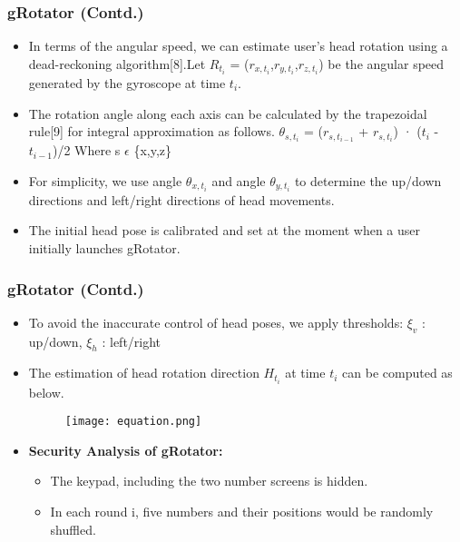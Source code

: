 \documentclass{beamer}
\begin{document}
\begin{frame}
\frametitle{gRotator (Contd.)}

\justifying

\begin{itemize}

\justifying

    \item  In terms of the angular speed, we can estimate
user's head rotation using a dead-reckoning algorithm[8].\newline Let
$R_{t_{i}}$ = ($r_{x,t_i}$,$r_{y,t_i}$,$r_{z,t_i}$) be the angular speed generated by the
gyroscope at time $t_i$.
    
    \item The rotation angle along each axis can be
calculated by the trapezoidal rule[9] for integral approximation
as follows.\newline
$\theta_{s,t_{i}}$ = ($r_{s,t_{i-1}}$ + $r_{s,t_{i}}$) · ($t_i$ - $t_{i-1}$)/2 \newline 
Where s $\epsilon$ \{x,y,z\}
    
    \item For simplicity, we use angle $\theta_{x,t_{i}}$ and angle $\theta_{y,t_{i}}$ to determine the up/down
directions and left/right directions of head movements.
    \item The initial head pose is calibrated and set at the
moment when a user initially launches gRotator.
\end{itemize}
\end{frame} 


\begin{frame}
\frametitle{gRotator (Contd.)}

\begin{itemize}

\justifying

    \item To avoid the inaccurate
control of head poses, we apply thresholds:\newline
$\xi_v$ : up/down,   $\xi_h$ : left/right
    
    \item  The estimation of head rotation direction
$H_{t_{i}}$ at time $t_i$ can be computed as below. 
\begin{figure}
    \begin{center}
        \texttt{[image: equation.png]}
    \end{center}
\end{figure}
    
    \item \textbf{Security Analysis of gRotator:}
    \begin{itemize}
    \item  The keypad, including the two number screens is hidden.
    \item  In each round i, five numbers and their positions
would be randomly shuffled.

    \end{itemize}
\end{itemize}

\end{frame}
\end{document}
